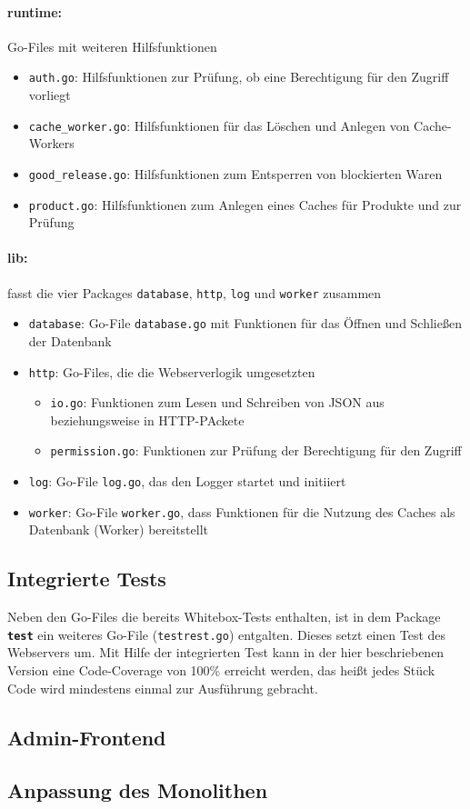 \paragraph{runtime:} Go-Files mit weiteren Hilfsfunktionen
	\begin{itemize}	
	\item \texttt{auth.go}: Hilfsfunktionen zur Prüfung, ob eine Berechtigung für den Zugriff vorliegt
	\item \texttt{cache\_worker.go}: Hilfsfunktionen für das Löschen und Anlegen von Cache-Workers
	\item \texttt{good\_release.go}: Hilfsfunktionen zum Entsperren von blockierten Waren
	\item \texttt{product.go}: Hilfsfunktionen zum Anlegen eines Caches für Produkte und zur Prüfung
	\end{itemize}


\newpage
\paragraph{lib:} fasst die vier Packages \texttt{database}, \texttt{http}, \texttt{log} und \texttt{worker} zusammen

	\begin{itemize}
	\item \texttt{database}: Go-File \texttt{database.go} mit Funktionen für das Öffnen und Schließen der Datenbank
	\item \texttt{http}: Go-Files, die die Webserverlogik umgesetzten
		\begin{itemize}
		\item \texttt{io.go}: Funktionen zum Lesen und Schreiben von JSON aus beziehungsweise in HTTP-PAckete
		\item \texttt{permission.go}: Funktionen zur Prüfung der Berechtigung für den Zugriff
		\end{itemize}	
	\item \texttt{log}: Go-File \texttt{log.go}, das den Logger startet und initiiert
	\item \texttt{worker}: Go-File \texttt{worker.go}, dass Funktionen für die Nutzung des Caches als Datenbank (Worker) bereitstellt 
	\end{itemize}

\subsection{Integrierte Tests}
\label{subsec: Integrierte Test}
Neben den Go-Files die bereits Whitebox-Tests enthalten, ist in dem Package \textbf{\texttt{test}} ein weiteres Go-File (\texttt{testrest.go}) entgalten. Dieses setzt einen Test des Webservers um. Mit Hilfe der integrierten Test kann in der hier beschriebenen Version eine Code-Coverage von 100\% erreicht werden, das heißt jedes Stück Code wird mindestens einmal zur Ausführung gebracht.

\subsection{Admin-Frontend}
\label{subsec: Admin-Frontend}



\subsection{Anpassung des Monolithen}
\label{subsec: Anpassung des Monolithen}
